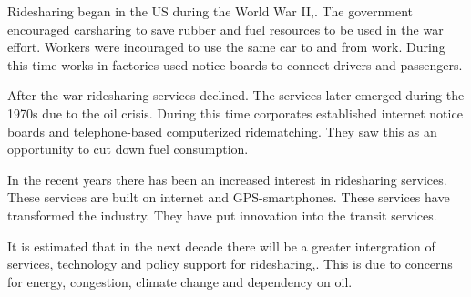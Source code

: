 Ridesharing began in the US during the World War II,\citet{Ferguson1997}. The government encouraged carsharing to save rubber and fuel resources to be used in the war effort. Workers were incouraged to use the same car to and from work. During this time works in factories used notice boards to connect drivers and passengers.

After the war ridesharing services declined. The services later emerged during the 1970s due to the oil crisis. During this time corporates established internet notice boards and telephone-based computerized ridematching. They saw this as an opportunity to cut down fuel consumption.

In the recent years there has been an increased interest in ridesharing services. These services are built on internet and GPS-smartphones. These services have transformed the industry. They have put innovation into the transit services.

It is estimated that in the next decade there will be a greater intergration of services, technology and policy support for ridesharing,\citet{Chan2012}. This is due to concerns for energy, congestion, climate change and dependency on oil.